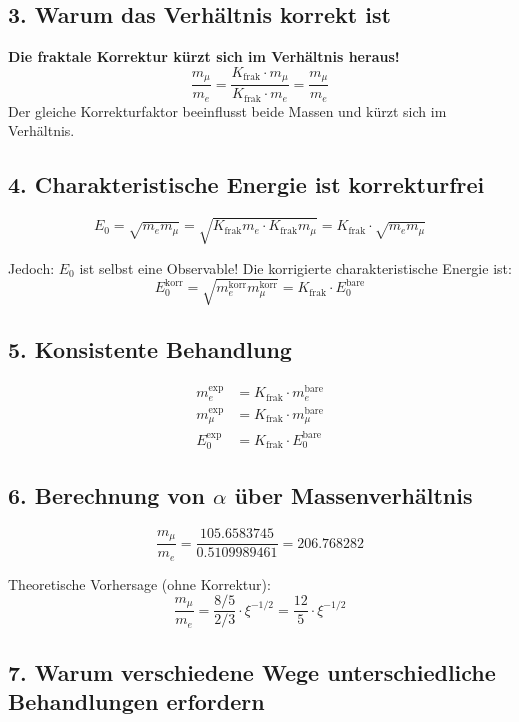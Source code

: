 \subsection{3. Warum das Verhältnis korrekt ist}

\begin{tcolorbox}[colback=green!5!white,colframe=green!75!black]
	\textbf{Die fraktale Korrektur kürzt sich im Verhältnis heraus!}
	\[
	\frac{m_\mu}{m_e} = \frac{K_{\text{frak}} \cdot m_\mu}{K_{\text{frak}} \cdot m_e} = \frac{m_\mu}{m_e}
	\]
	Der gleiche Korrekturfaktor beeinflusst beide Massen und kürzt sich im Verhältnis.
\end{tcolorbox}

\subsection{4. Charakteristische Energie ist korrekturfrei}

\[
E_0 = \sqrt{m_e m_\mu} = \sqrt{K_{\text{frak}} m_e \cdot K_{\text{frak}} m_\mu} = K_{\text{frak}} \cdot \sqrt{m_e m_\mu}
\]

Jedoch: $E_0$ ist selbst eine Observable! Die korrigierte charakteristische Energie ist:
\[
E_0^{\text{korr}} = \sqrt{m_e^{\text{korr}} m_\mu^{\text{korr}}} = K_{\text{frak}} \cdot E_0^{\text{bare}}
\]

\subsection{5. Konsistente Behandlung}

\begin{align*}
	m_e^{\text{exp}} &= K_{\text{frak}} \cdot m_e^{\text{bare}} \\
	m_\mu^{\text{exp}} &= K_{\text{frak}} \cdot m_\mu^{\text{bare}} \\
	E_0^{\text{exp}} &= K_{\text{frak}} \cdot E_0^{\text{bare}}
\end{align*}

\subsection{6. Berechnung von $\alpha$ über Massenverhältnis}

\[
\frac{m_\mu}{m_e} = \frac{105.6583745}{0.5109989461} = 206.768282
\]

Theoretische Vorhersage (ohne Korrektur):
\[
\frac{m_\mu}{m_e} = \frac{8/5}{2/3} \cdot \xi^{-1/2} = \frac{12}{5} \cdot \xi^{-1/2}
\]

\subsection{7. Warum verschiedene Wege unterschiedliche Behandlungen erfordern}

